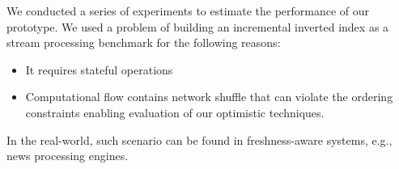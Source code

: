 \label {fs-short-experiments}

We conducted a  series of experiments to estimate the performance of our  prototype. We used a problem of building an incremental inverted index as a stream processing benchmark  for the following reasons:

\begin{itemize}
    \item It requires stateful operations
    \item Computational flow contains network shuffle that can violate the ordering constraints 
    enabling evaluation of our optimistic techniques.
\end{itemize}

In the real-world, such scenario can be found in freshness-aware systems, e.g., news processing engines.